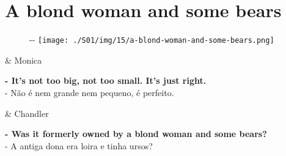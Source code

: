 \hypertarget{a-blond-woman-and-some-bears}{%
\section{A blond woman and some
bears}\label{a-blond-woman-and-some-bears}}

\begin{figure}[!ht]
  \begin{adjustwidth}{-\oddsidemargin-1in}{-\rightmargin}
    \centering
    \texttt{[image: ./S01/img/15/a-blond-woman-and-some-bears.png]}
  \end{adjustwidth}
\end{figure}

\begin{tcolorbox}[enhanced,center upper,
    drop fuzzy shadow southeast, boxrule=0.3pt,
    lower separated=false, breakable,
    colframe=black!30!dialogoBorder,colback=white]
\begin{minipage}[c]{0.16\linewidth}
   & \centering \scriptsize{Monica}
\end{minipage}
\hfill
\begin{minipage}[c]{0.8\linewidth}
  \textbf{- It's not too big, not too small. It's just right.}\\
  - Não é nem grande nem pequeno, é perfeito.
\end{minipage}

\medskip
\begin{minipage}[c]{0.16\linewidth}
   & \centering \scriptsize{Chandler}
\end{minipage}
\hfill
\begin{minipage}[c]{0.8\linewidth}
  \textbf{- Was it formerly owned by a blond woman and some bears?}\\
  - A antiga dona era loira e tinha ursos?
\end{minipage}
\end{tcolorbox}

